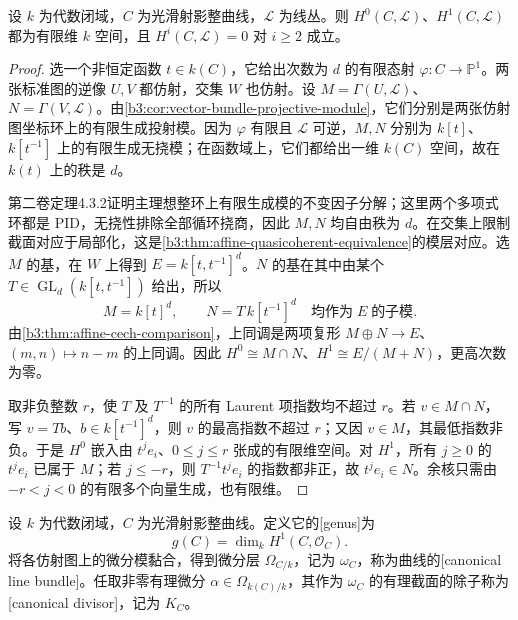 \begin{proposition}\label{b3:prop:H-curve-cohomology-finite}
	设 \(k\) 为代数闭域，\(C\) 为光滑射影整曲线，\(\mathcal L\) 为线丛。则 \(H^0(C,\mathcal L)\)、\(H^1(C,\mathcal L)\) 都为有限维 \(k\) 空间，且 \(H^i(C,\mathcal L)=0\) 对 \(i\ge2\) 成立。
\end{proposition}
\begin{proof}
	选一个非恒定函数 \(t\in k(C)\)，它给出次数为 \(d\) 的有限态射 \(\varphi:C\rightarrow\mathbb P^1\)。两张标准图的逆像 \(U,V\) 都仿射，交集 \(W\) 也仿射。设 \(M=\Gamma(U,\mathcal L)\)、\(N=\Gamma(V,\mathcal L)\)。由\cref{b3:cor:vector-bundle-projective-module}，它们分别是两张仿射图坐标环上的有限生成投射模。因为 \(\varphi\) 有限且 \(\mathcal L\) 可逆，\(M,N\) 分别为 \(k[t]\)、\(k[t^{-1}]\) 上的有限生成无挠模；在函数域上，它们都给出一维 \(k(C)\) 空间，故在 \(k(t)\) 上的秩是 \(d\)。

	第二卷定理4.3.2证明主理想整环上有限生成模的不变因子分解；这里两个多项式环都是 PID，无挠性排除全部循环挠商，因此 \(M,N\) 均自由秩为 \(d\)。在交集上限制截面对应于局部化，这是\cref{b3:thm:affine-quasicoherent-equivalence}的模层对应。选 \(M\) 的基，在 \(W\) 上得到 \(E=k[t,t^{-1}]^d\)。\(N\) 的基在其中由某个 \(T\in\operatorname{GL}_d(k[t,t^{-1}])\) 给出，所以
	\[
		M=k[t]^d,\qquad N=T\,k[t^{-1}]^d\quad\text{均作为}\;E\;\text{的子模}.
	\]
	由\cref{b3:thm:affine-cech-comparison}，上同调是两项复形 \(M\oplus N\rightarrow E\)、\((m,n)\mapsto n-m\) 的上同调。因此 \(H^0\cong M\cap N\)、\(H^1\cong E/(M+N)\)，更高次数为零。

	取非负整数 \(r\)，使 \(T\) 及 \(T^{-1}\) 的所有 Laurent 项指数均不超过 \(r\)。若 \(v\in M\cap N\)，写 \(v=Tb\)、\(b\in k[t^{-1}]^d\)，则 \(v\) 的最高指数不超过 \(r\)；又因 \(v\in M\)，其最低指数非负。于是 \(H^0\) 嵌入由 \(t^je_i\)、\(0\le j\le r\) 张成的有限维空间。对 \(H^1\)，所有 \(j\ge0\) 的 \(t^je_i\) 已属于 \(M\)；若 \(j\le-r\)，则 \(T^{-1}t^je_i\) 的指数都非正，故 \(t^je_i\in N\)。余核只需由 \(-r<j<0\) 的有限多个向量生成，也有限维。
\end{proof}

\begin{definition}\label{b3:def:H-genus-canonical}
	设 \(k\) 为代数闭域，\(C\) 为光滑射影整曲线。定义它的[genus]为
	\[
		g(C)=\dim_kH^1(C,\mathcal O_C).
	\]
	将各仿射图上的微分模黏合，得到微分层 \(\Omega_{C/k}\)，记为 \(\omega_C\)，称为曲线的[canonical line bundle]。任取非零有理微分 \(\alpha\in\Omega_{k(C)/k}\)，其作为 \(\omega_C\) 的有理截面的除子称为[canonical divisor]，记为 \(K_C\)。
\end{definition}

